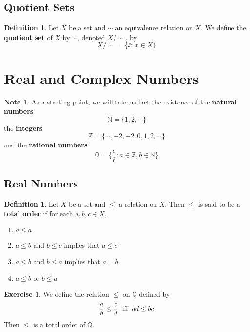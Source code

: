 \documentclass[12pt]{amsart}
\theoremstyle{definition}
\newtheorem{defn}[definition]{Definition}
\newtheorem{note}[definition]{Note}
\newtheorem{ex}[definition]{Exercise}
\newcommand{\N}{\mathbb{N}}
\newcommand{\Z}{\mathbb{Z}}
\newcommand{\Q}{\mathbb{Q}}
\newcommand{\tbf}[1]{\textbf{#1}}
\DeclareMathOperator*{\0}{\mbf{0}}
\DeclareMathOperator*{\1}{\mbf{1}}
\newcommand{\lex}[1]{\label{ex:#1}}
\newcommand{\ld}[1]{\label{defn:#1}}
\begin{document}
	
	
	
	
	
	
	
	
	
	
	
	
	
	
	
	
	
	\newpage
	\subsection{Quotient Sets}
	\begin{defn}
	Let $X$ be a set and $\sim$ an equivalence relation on $X$. We define the \tbf{quotient set} of $X$ by $\sim$, denoted $X/ {\sim}$, by 
	\begin{equation*}
	X/ {\sim} = \{\bar{x}: x \in X\}
	\end{equation*}
	\end{defn}
	
	
	\section{Real and Complex Numbers}
	\begin{note}
		As a starting point, we will take as fact the existence of the \tbf{natural numbers} $$\N = \{1, 2, \cdots\}$$ the \tbf{integers} $$\Z = \{\cdots, -2, -2, 0, 1, 2, \cdots\}$$ and the \tbf{rational numbers} $$\Q = \bigg \{\frac{a}{b}: a \in \Z, b \in \N \bigg \}$$
	\end{note}
	\subsection{Real Numbers}
	
	\begin{defn} \ld{}
		Let $X$ be a set and $\leq$ a relation on $X$. Then $\leq$ is said to be a \tbf{total order} if for each $a,b,c \in X$,
		\begin{enumerate}
			\item $a \leq a$
			\item $a \leq b$ and $b \leq c$ implies that $a \leq  c$ 
			\item $a \leq b$ and $b \leq a$ implies that $a = b$ 
			\item $a \leq b$ or $b \leq a$
		\end{enumerate}
	\end{defn}

	\begin{ex} \lex{}
		We define the relation $\leq$ on $\Q$ defined by $$\frac{a}{b} \leq \frac{c}{d} \hspace{.2cm} \text{iff} \hspace{.2cm} ad \leq bc$$ Then $\leq$ is a total order of $\Q$.
	\end{ex}
\end{document}
